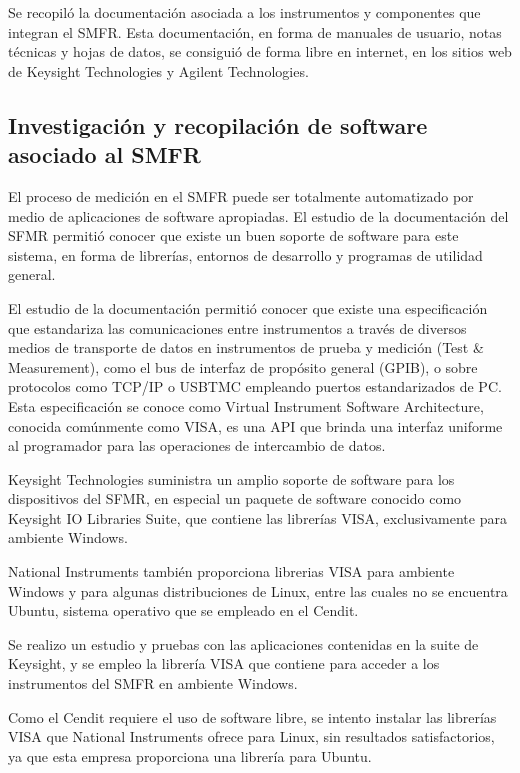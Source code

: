 \documentclass[paper=letter,oneside,fontsize=12pt, parskip=full]{article}
\begin{document}
	Se recopiló la documentación asociada a los instrumentos y componentes que integran el SMFR. Esta documentación, en forma de manuales de usuario, notas técnicas y hojas de datos, se consiguió de forma libre en internet, en los sitios web de Keysight Technologies y Agilent Technologies. 	
	
	\subsection{Investigación y recopilación de software asociado al SMFR}
	
	El proceso de medición en el SMFR puede ser totalmente automatizado por medio de aplicaciones de software apropiadas. El estudio de la documentación del SFMR permitió conocer que existe un buen soporte de software para este sistema, en forma de librerías, entornos de desarrollo y programas de utilidad general.
	
	El estudio de la documentación permitió conocer que existe una especificación que estandariza las comunicaciones entre instrumentos a través de diversos medios de transporte de datos en instrumentos de prueba y medición (Test \& Measurement), como  el bus de interfaz de propósito general (GPIB), o sobre protocolos como TCP/IP o USBTMC empleando puertos estandarizados de PC. Esta especificación se conoce como Virtual Instrument Software Architecture, conocida comúnmente como VISA, es una API que brinda una interfaz uniforme al programador para las operaciones de intercambio de datos. 
	
	Keysight Technologies suministra un amplio soporte de software para los dispositivos del SFMR, en especial un paquete de software conocido como Keysight IO Libraries Suite, que contiene las librerías VISA, exclusivamente para ambiente Windows. 
	
	National Instruments también proporciona librerias VISA para ambiente Windows y para algunas distribuciones de Linux, entre las cuales no se encuentra Ubuntu, 
	sistema operativo que se empleado en el Cendit.
	
	Se realizo un estudio y pruebas con las aplicaciones contenidas en la suite de Keysight, y se empleo la librería VISA que contiene para acceder a los instrumentos del SMFR en ambiente Windows.
	
	Como el Cendit requiere el uso de software libre, se intento instalar las librerías VISA que National Instruments ofrece para Linux, sin resultados satisfactorios, ya que esta empresa proporciona una librería para Ubuntu.	
	
\end{document}
